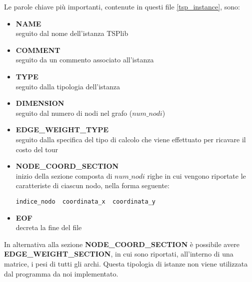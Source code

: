Le parole chiave più importanti, contenute in questi file \ref{tsp_instance}, sono:
\begin{itemize}
\item{\textbf{NAME}\\
seguito dal nome dell'istanza TSPlib}
\item{\textbf{COMMENT}\\
seguito da un commento associato all'istanza}
\item{\textbf{TYPE}\\
seguito dalla tipologia dell'istanza}
\item{\textbf{DIMENSION}\\
seguito dal numero di nodi nel grafo ($num\_nodi$)}
\item{\textbf{EDGE\_WEIGHT\_TYPE}\\
seguito dalla specifica del tipo di calcolo che viene effettuato per ricavare il costo del tour}
\item{\textbf{NODE\_COORD\_SECTION}\\
inizio della sezione composta di $num\_nodi$ righe in cui vengono riportate le caratteriste di ciascun nodo, nella forma seguente:
\begin{lstlisting}[linewidth=250pt,basicstyle=\footnotesize\sffamily,]     
indice_nodo  coordinata_x  coordinata_y
\end{lstlisting}}
\item{\textbf{EOF}\\
decreta la fine del file}
\end{itemize}

In alternativa alla sezione \textbf{NODE\_COORD\_SECTION} è possibile avere\\
\textbf{EDGE\_WEIGHT\_SECTION}, in cui sono riportati, all'interno di una matrice, i pesi di tutti gli archi. Questa tipologia di istanze non viene utilizzata dal programma da noi implementato.

